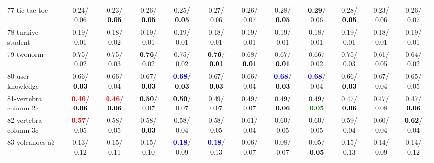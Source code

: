 \begin{table}[h]
\begin{center}
{\begin{tabular}{lc|c|c|c|c|c|c|c|c|c|c}
77-tic tac toe &   0.24/  0.06 &   0.23/\textcolor{black}{\textbf{  0.05}} &   0.26/\textcolor{black}{\textbf{  0.05}} &   0.25/\textcolor{black}{\textbf{  0.05}} &   0.27/  0.06 &   0.26/  0.07 &   0.28/\textcolor{black}{\textbf{  0.05}} & \textcolor{black}{\textbf{  0.29}}/  0.06 &   0.28/\textcolor{black}{\textbf{  0.05}} &   0.23/  0.06 &   0.26/  0.07 \\
78-turkiye student &   0.19/  0.01 &   0.18/  0.02 &   0.19/  0.01 &   0.19/  0.01 &   0.18/  0.01 &   0.19/  0.01 &   0.19/  0.01 &   0.18/  0.01 &   0.19/  0.01 &   0.18/  0.01 &   0.19/  0.01 \\ \hline
79-twonorm &   0.75/  0.02 &   0.75/  0.03 & \textcolor{black}{\textbf{  0.76}}/  0.02 &   0.75/  0.02 & \textcolor{black}{\textbf{  0.76}}/\textcolor{black}{\textbf{  0.01}} &   0.68/\textcolor{black}{\textbf{  0.01}} &   0.67/\textcolor{black}{\textbf{  0.01}} &   0.66/  0.02 &   0.75/  0.03 &   0.61/  0.05 &   0.64/  0.02 \\
80-user knowledge &   0.66/\textcolor{black}{\textbf{  0.03}} &   0.66/  0.04 &   0.67/\textcolor{black}{\textbf{  0.03}} & \textcolor{blue}{\textbf{  0.68}}/\textcolor{black}{\textbf{  0.03}} &   0.67/\textcolor{black}{\textbf{  0.03}} &   0.66/  0.04 & \textcolor{blue}{\textbf{  0.68}}/\textcolor{black}{\textbf{  0.03}} & \textcolor{blue}{\textbf{  0.68}}/  0.04 &   0.66/\textcolor{black}{\textbf{  0.03}} &   0.67/  0.04 &   0.65/  0.05 \\
81-vertebra column 2c & \textcolor{red}{\textbf{  0.46}}/\textcolor{black}{\textbf{  0.06}} & \textcolor{red}{\textbf{  0.46}}/\textcolor{black}{\textbf{  0.06}} & \textcolor{black}{\textbf{  0.50}}/  0.07 & \textcolor{black}{\textbf{  0.50}}/  0.07 &   0.49/  0.07 &   0.49/  0.07 &   0.49/\textcolor{black}{\textbf{  0.06}} &   0.49/\textcolor{darkgreen}{\textbf{  0.05}} &   0.47/\textcolor{black}{\textbf{  0.06}} &   0.47/  0.08 &   0.47/\textcolor{black}{\textbf{  0.06}} \\
82-vertebra column 3c & \textcolor{red}{\textbf{  0.57}}/  0.05 &   0.58/  0.05 &   0.58/\textcolor{black}{\textbf{  0.03}} &   0.58/  0.04 &   0.58/  0.05 &   0.61/  0.04 &   0.60/  0.05 &   0.60/  0.05 &   0.59/  0.04 &   0.60/  0.04 & \textcolor{black}{\textbf{  0.62}}/  0.04 \\
83-volcanoes a3 &   0.13/  0.12 &   0.15/  0.11 &   0.15/  0.10 & \textcolor{blue}{\textbf{  0.18}}/  0.09 & \textcolor{blue}{\textbf{  0.18}}/  0.13 &   0.06/  0.07 &   0.08/  0.07 &   0.05/\textcolor{black}{\textbf{  0.05}} &   0.15/  0.13 &   0.14/  0.09 &   0.14/  0.12 \\

\end{tabular}}
\end{center}
\end{table}
